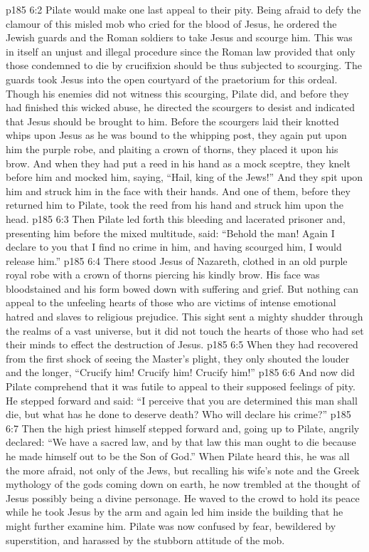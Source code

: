 \vs p185 6:2 Pilate would make one last appeal to their pity. Being afraid to defy the clamour of this misled mob who cried for the blood of Jesus, he ordered the Jewish guards and the Roman soldiers to take Jesus and scourge him. This was in itself an unjust and illegal procedure since the Roman law provided that only those condemned to die by crucifixion should be thus subjected to scourging. The guards took Jesus into the open courtyard of the praetorium for this ordeal. Though his enemies did not witness this scourging, Pilate did, and before they had finished this wicked abuse, he directed the scourgers to desist and indicated that Jesus should be brought to him. Before the scourgers laid their knotted whips upon Jesus as he was bound to the whipping post, they again put upon him the purple robe, and plaiting a crown of thorns, they placed it upon his brow. And when they had put a reed in his hand as a mock sceptre, they knelt before him and mocked him, saying, “Hail, king of the Jews!” And they spit upon him and struck him in the face with their hands. And one of them, before they returned him to Pilate, took the reed from his hand and struck him upon the head.
\vs p185 6:3 Then Pilate led forth this bleeding and lacerated prisoner and, presenting him before the mixed multitude, said: “Behold the man! Again I declare to you that I find no crime in him, and having scourged him, I would release him.”
\vs p185 6:4 There stood Jesus of Nazareth, clothed in an old purple royal robe with a crown of thorns piercing his kindly brow. His face was bloodstained and his form bowed down with suffering and grief. But nothing can appeal to the unfeeling hearts of those who are victims of intense emotional hatred and slaves to religious prejudice. This sight sent a mighty shudder through the realms of a vast universe, but it did not touch the hearts of those who had set their minds to effect the destruction of Jesus.
\vs p185 6:5 When they had recovered from the first shock of seeing the Master’s plight, they only shouted the louder and the longer, “Crucify him! Crucify him! Crucify him!”
\vs p185 6:6 And now did Pilate comprehend that it was futile to appeal to their supposed feelings of pity. He stepped forward and said: “I perceive that you are determined this man shall die, but what has he done to deserve death? Who will declare his crime?”
\vs p185 6:7 Then the high priest himself stepped forward and, going up to Pilate, angrily declared: “We have a sacred law, and by that law this man ought to die because he made himself out to be the Son of God.” When Pilate heard this, he was all the more afraid, not only of the Jews, but recalling his wife’s note and the Greek mythology of the gods coming down on earth, he now trembled at the thought of Jesus possibly being a divine personage. He waved to the crowd to hold its peace while he took Jesus by the arm and again led him inside the building that he might further examine him. Pilate was now confused by fear, bewildered by superstition, and harassed by the stubborn attitude of the mob.
